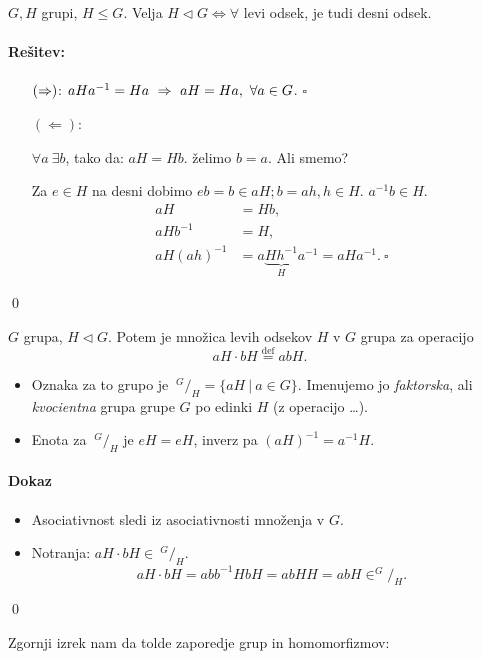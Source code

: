 \begin{zgled}
	$G, H$ grupi, $H \leq G$. Velja $H \lhd G \iff \forall$ levi odsek, je tudi desni odsek.
	\paragraph{Re\v sitev:}
	\begin{itemize}
		\item[$(\Rightarrow)$:]{$aHa^{-1} = Ha\ \Rightarrow\ aH = Ha,\ \forall a \in G$. $\square$}
		\item[$(\Leftarrow)$:]{$\forall a\ \exists b$, tako da: $aH = Hb$. \v zelimo $b = a$. Ali smemo?
		
		Za $e \in H$ na desni dobimo $eb = b \in aH; b = ah, h \in H$. $a^{-1}b \in H$.
		\begin{align*}
			aH &= Hb, \\
			aHb^{-1} &= H, \\
			aH (ah)^{-1} &= a\underbrace{Hh^{-1}}_{H}a^{-1} = aHa^{-1}.\ \square
		\end{align*}}
	\end{itemize}
\qed
\end{zgled}

\begin{trditev}
	$G$ grupa, $H \lhd G$. Potem je mno\v zica levih odsekov $H$ v $G$ grupa za operacijo
	\[
		aH \cdot bH \stackrel{\text{def}}{=} abH.
	\]
	\begin{itemize}
		\item{Oznaka za to grupo je $\ ^G/_H = \{aH\ |\ a\in G\}$. Imenujemo jo \emph{faktorska}, ali
			\emph{kvocientna} grupa grupe $G$ po edinki $H$ (z operacijo \ldots).}
		\item{Enota za $\ ^G/_H$ je $eH = eH$, inverz pa $(aH)^{-1} = a^{-1} H$.}
	\end{itemize}
\end{trditev}

\paragraph{Dokaz}
\begin{itemize}
	\item{Asociativnost sledi iz asociativnosti mno\v zenja v $G$.}
	\item{Notranja: $aH \cdot bH \in\ ^G/_H$.
		\[
			aH \cdot bH = abb^{-1}HbH = ab HH = ab H \in ^G/_H.
		\]}
\end{itemize}
\qed

\ni Zgornji izrek nam da tolde zaporedje grup in homomorfizmov:

